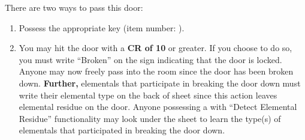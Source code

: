\documentclass[green]{elementals}
\begin{document}
\name{\gLockedDoorAccess{}}

There are two ways to pass this door:
\begin{enumerate}
 \item Possess the appropriate key (item number: \iLabKey{\MYnumber}).
 \item You may hit the door with a {\bf CR of 10} or greater. If you choose to do so, you must write ``Broken'' on the sign indicating that the door is locked. Anyone may now freely pass into the room since the door has been broken down. {\bf Further,} elementals that participate in breaking the door down must write their elemental type on the back of sheet since this action leaves elemental residue on the door. Anyone possessing a \iTricorder{} with ``Detect Elemental Residue'' functionality may look under the sheet to learn the type(s) of elementals that participated in breaking the door down.
\end{enumerate}
  
\end{document}
